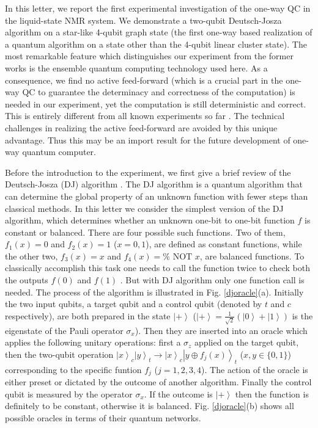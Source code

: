 \documentclass[showpacs,superscriptaddress,twocolumn,prl]{revtex4}
\begin{document}
In this letter, we report the first experimental investigation of the
one-way QC in the liquid-state NMR system. We demonstrate a two-qubit
Deutsch-Josza algorithm on a star-like 4-qubit graph state (the first
one-way based realization of a quantum algorithm on a state other than the
4-qubit linear cluster state). The most remarkable feature which
distinguishes our experiment from the former works is the ensemble quantum
computing technology used here. As a consequence, we find no active
feed-forward (which is a crucial part in the one-way QC to guarantee the
determinacy and correctness of the computation) is needed in our experiment,
yet the computation is still deterministic and correct. This is entirely
different from all known experiments so far \cite{eworkn1,eworkn2,eworkdj}.
The technical challenges in realizing the active feed-forward are avoided by
this unique advantage. Thus this may be an import result for the future
development of one-way quantum computer.

Before the introduction to the experiment, we first give a brief review of
the Deutsch-Josza (DJ) algorithm \cite{DJ}. The DJ algorithm is a quantum
algorithm that can determine the global property of an unknown function with
fewer steps than classical methods. In this letter we consider the simplest
version of the DJ algorithm, which determines whether an unknown one-bit to
one-bit function $f$ is constant or balanced. There are four possible such
functions. Two of them, $f_{1}(x)=0$ and $f_{2}(x)=1$ ($x=0,1$), are defined
as constant functions, while the other two, $f_{3}(x)=x$ and $f_{4}(x)=\text{%
NOT }x$, are balanced functions. To classically accomplish this task one
needs to call the function twice to check both the outputs $f(0)$ and $f(1)$%
. But with DJ algorithm only one function call is needed. The process of the
algorithm is illustrated in Fig. \ref{djoracle}(a). Initially the two input
qubits, a target qubit and a control qubit (denoted by $t$ and $c$
respectively), are both prepared in the state $\left\vert +\right\rangle $ ($%
\left\vert +\right\rangle =\frac{1}{\sqrt{2}}(\left\vert 0\right\rangle
+\left\vert 1\right\rangle )$ is the eigenstate of the Pauli operator $%
\sigma _{x}$). Then they are inserted into an oracle which applies the
following unitary operations: first a $\sigma _{z}$ applied on the target
qubit, then the two-qubit operation $\left\vert x\right\rangle
_{c}\left\vert y\right\rangle _{t}\rightarrow \left\vert x\right\rangle
_{c}\left\vert y\oplus f_{j}(x)\right\rangle _{t}$ ($x,y\in \{0,1\}$)
corresponding to the specific funtion $f_{j}$ ($j=1,2,3,4$). The action of
the oracle is either preset or dictated by the outcome of another algorithm.
Finally the control qubit is measured by the operator $\sigma _{x}$. If the
outcome is $\left\vert +\right\rangle $ then the function is definitely to
be constant, otherwise it is balanced. Fig. \ref{djoracle}(b) shows all
possible oracles in terms of their quantum networks.
\end{document}
